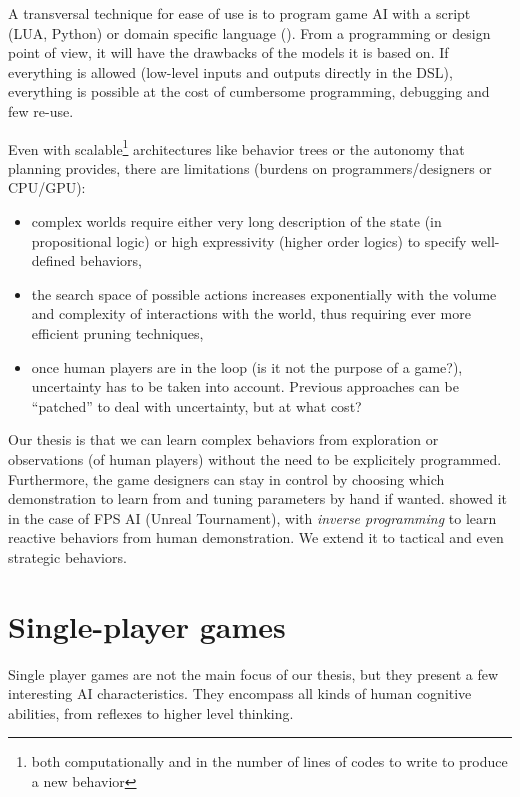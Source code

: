 A transversal technique for ease of use is to program game AI with a script (LUA, Python) or domain specific language (). From a programming or design point of view, it will have the drawbacks of the models it is based on. If everything is allowed (low-level inputs and outputs directly in the DSL), everything is possible at the cost of cumbersome programming, debugging and few re-use.

Even with scalable\footnote{both computationally and in the number of lines of codes to write to produce a new behavior} architectures like behavior trees or the autonomy that planning provides, there are limitations (burdens on programmers/designers or CPU/GPU):
\begin{itemize}
    \item complex worlds require either very long description of the state (in propositional logic) or high expressivity (higher order logics) to specify well-defined behaviors,
    \item the search space of possible actions increases exponentially with the volume and complexity of interactions with the world, thus requiring ever more efficient pruning techniques,
    \item once human players are in the loop (is it not the purpose of a game?), uncertainty has to be taken into account. Previous approaches can be ``patched'' to deal with uncertainty, but at what cost?
\end{itemize}
Our thesis is that we can learn complex behaviors from exploration or observations (of human players) without the need to be explicitely programmed. Furthermore, the game designers can stay in control by choosing which demonstration to learn from and tuning parameters by hand if wanted. \citet{LeHy04} showed it in the case of FPS AI (Unreal Tournament), with \textit{inverse programming} to learn reactive behaviors from human demonstration. We extend it to tactical and even strategic behaviors.


\section{Single-player games}

Single player games are not the main focus of our thesis, but they present a few interesting AI characteristics. They encompass all kinds of human cognitive abilities, from reflexes to higher level thinking.

